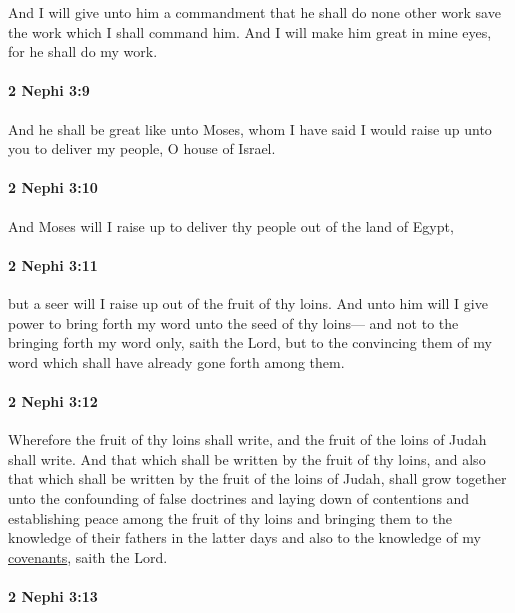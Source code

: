 			And I will give unto him a commandment
			that he shall do none other work
			save the work which I shall command him.
			And I will make him great in mine eyes,
			for he shall do my work.

		\paragraph{2 Nephi 3:9} %
			\label{2NEPHI-3-9}

			And he shall be great like unto Moses,
			whom I have said I would raise up unto you
			to deliver my people, O house of Israel.

		\paragraph{2 Nephi 3:10} %
			\label{2NEPHI-3-10}

			And Moses will I raise up to deliver thy people out of the land of Egypt,

		\paragraph{2 Nephi 3:11} %
			\label{2NEPHI-3-11}

			but a seer will I raise up out of the fruit of thy loins.
			And unto him will I give power to bring forth my word unto the seed of thy loins---
			and not to the bringing forth my word only, saith the Lord,
			but to the convincing them of my word
			which shall have already gone forth among them.

		\paragraph{2 Nephi 3:12} %
			\label{2NEPHI-3-12}

			Wherefore the fruit of thy loins shall write,
			and the fruit of the loins of Judah shall write.
			And that which shall be written by the fruit of thy loins,
			and also that which shall be written by the fruit of the loins of Judah,
			shall grow together unto the confounding of false doctrines
			and laying down of contentions
			and establishing peace among the fruit of thy loins
			and bringing them to the knowledge of their fathers in the latter days
			and also to the knowledge of my \hyperref[COVENANT]{covenants}, saith the Lord.

		\paragraph{2 Nephi 3:13} %
			\label{2NEPHI-3-13}

